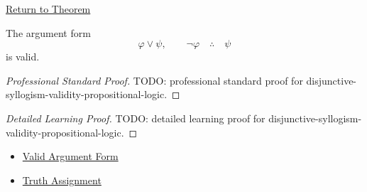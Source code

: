 \newpage
{}
\label{prf:disjunctive-syllogism-validity-propositional-logic}

\begin{remark*}[Return]
\hyperref[thm:disjunctive-syllogism-validity-propositional-logic]{Return to Theorem}
\end{remark*}

\begin{theorem*}
The argument form
\[
\varphi\lor\psi,\qquad \neg\varphi \quad\therefore\quad \psi
\]
is valid.
\end{theorem*}

\begin{proof}[Professional Standard Proof]
\LRAProofBodyStart
TODO: professional standard proof for disjunctive-syllogism-validity-propositional-logic.
\end{proof}

\begin{proof}[Detailed Learning Proof]
\LRAProofBodyStart
TODO: detailed learning proof for disjunctive-syllogism-validity-propositional-logic.
\end{proof}

\begin{remark*}
\end{remark*}

\begin{dependencies}
\begin{itemize}
  \item \hyperref[def:valid-argument-form-propositional-logic]{Valid Argument Form}
  \item \hyperref[def:truth-assignment-propositional-logic]{Truth Assignment}
\end{itemize}
\end{dependencies}

\clearpage
